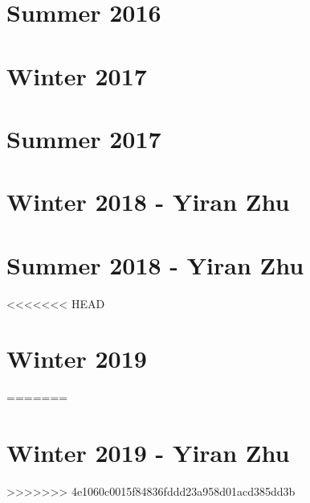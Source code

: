\documentclass[12pt]{article}
\begin{document}
\section{Summer 2016}\label{sec:s16}

\newpage
\section{Winter 2017}\label{sec:w17}

\newpage
\section{Summer 2017}\label{sec:s17}

\newpage
\section{Winter 2018 - Yiran Zhu}\label{sec:w18}

\newpage
\section{Summer 2018 - Yiran Zhu}\label{sec:s18}

<<<<<<< HEAD
\section{Winter 2019}\label{sec:w19}
=======
\newpage
\section{Winter 2019 - Yiran Zhu}\label{sec:w19}
>>>>>>> 4e1060c0015f84836fddd23a958d01acd385dd3b

\end{document}
